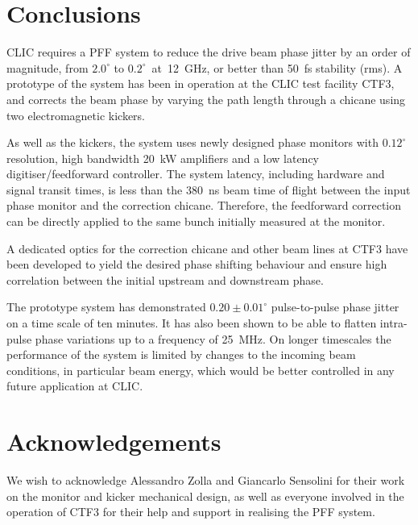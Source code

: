 \documentclass[%
 reprint,
superscriptaddress,
 amsmath,amssymb,
 prl,
]{revtex4-1}
\begin{document}
\section{\label{s:conc}Conclusions}

CLIC requires a PFF system to reduce the drive beam phase jitter by an order of 
magnitude, from \(2.0^\circ\) to \(0.2^\circ\)~at~12~GHz, or better than 50~fs 
stability (rms). A prototype of the system has been 
in operation at the CLIC test facility CTF3, and corrects the beam phase by 
varying the path length through a chicane using two electromagnetic kickers. 

As well as the kickers, the system uses newly designed phase monitors with 
\(0.12^\circ\) resolution, high bandwidth 20~kW amplifiers and a low latency 
digitiser/feedforward controller. The system latency, including hardware and 
signal transit times, is less than the 380~ns beam time of flight between the 
input phase monitor and the correction chicane. Therefore, the feedforward 
correction can be directly applied to the same bunch initially measured at the monitor.

A dedicated optics for the correction chicane and other beam lines at CTF3 have been 
developed to yield the desired phase shifting behaviour and ensure high 
correlation between the initial upstream and downstream phase.

The prototype system has demonstrated \(0.20\pm0.01^\circ\) pulse-to-pulse 
phase jitter on a time scale of ten minutes. It has also been shown to be able 
to flatten intra-pulse phase variations up to a frequency of 25~MHz. On longer 
timescales the performance of the system is limited by changes to the incoming 
beam conditions, in particular beam energy, which would be better controlled in 
any future application at CLIC.



\section{\label{s:ack}Acknowledgements}
\begin{acknowledgments}
We wish to acknowledge Alessandro Zolla and Giancarlo Sensolini 
for their work on the monitor and kicker mechanical design,
as well as everyone involved in the operation of CTF3 for their 
help and support in realising the PFF system.
\end{acknowledgments}

\end{document}
